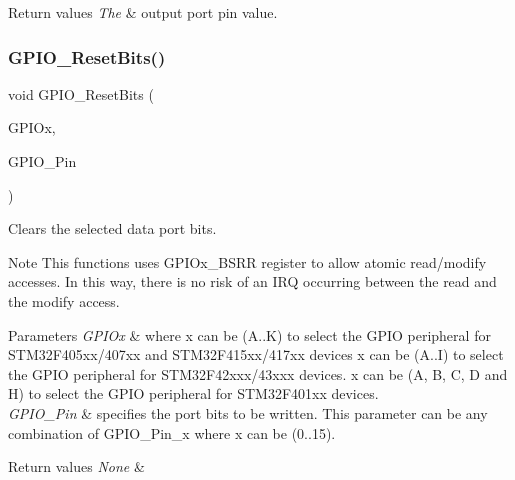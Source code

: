 \begin{DoxyRetVals}{Return values}
{\em The} & output port pin value. \\
\hline
\end{DoxyRetVals}
\mbox{\label{group___g_p_i_o___group2_ga6fcd35b207a66608dd2c9d7de9247dc8}} 
\subsubsection{\texorpdfstring{G\+P\+I\+O\+\_\+\+Reset\+Bits()}{GPIO\_ResetBits()}}
{\footnotesize\ttfamily void G\+P\+I\+O\+\_\+\+Reset\+Bits (\begin{DoxyParamCaption}\item[{G\+P\+I\+O\+\_\+\+Type\+Def $\ast$}]{G\+P\+I\+Ox,  }\item[{uint16\+\_\+t}]{G\+P\+I\+O\+\_\+\+Pin }\end{DoxyParamCaption})}



Clears the selected data port bits. 

\begin{DoxyNote}{Note}
This functions uses G\+P\+I\+Ox\+\_\+\+B\+S\+RR register to allow atomic read/modify accesses. In this way, there is no risk of an I\+RQ occurring between the read and the modify access. 
\end{DoxyNote}

\begin{DoxyParams}{Parameters}
{\em G\+P\+I\+Ox} & where x can be (A..K) to select the G\+P\+IO peripheral for S\+T\+M32\+F405xx/407xx and S\+T\+M32\+F415xx/417xx devices x can be (A..I) to select the G\+P\+IO peripheral for S\+T\+M32\+F42xxx/43xxx devices. x can be (A, B, C, D and H) to select the G\+P\+IO peripheral for S\+T\+M32\+F401xx devices. \\
\hline
{\em G\+P\+I\+O\+\_\+\+Pin} & specifies the port bits to be written. This parameter can be any combination of G\+P\+I\+O\+\_\+\+Pin\+\_\+x where x can be (0..15). \\
\hline
\end{DoxyParams}

\begin{DoxyRetVals}{Return values}
{\em None} & \\
\hline
\end{DoxyRetVals}
\mbox{\label{group___g_p_i_o___group2_ga9e1352eed7c6620e18af2d86f6b6ff8e}} 
